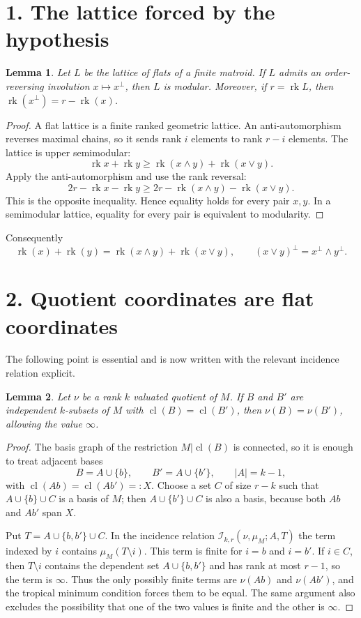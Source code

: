 \documentclass[12pt]{article}
\newcommand{\rk}{\operatorname{rk}}
\newcommand{\cl}{\operatorname{cl}}
\newtheorem{lemma}{Lemma}
\begin{document}
\section*{1. The lattice forced by the hypothesis}

\begin{lemma}
Let $L$ be the lattice of flats of a finite matroid.  If $L$ admits an
order-reversing involution $x\mapsto x^\perp$, then $L$ is modular.
Moreover, if $r=\rk L$, then $\rk(x^\perp)=r-\rk(x)$.
\end{lemma}

\begin{proof}
A flat lattice is a finite ranked geometric lattice.  An
anti-automorphism reverses maximal chains, so it sends rank $i$
elements to rank $r-i$ elements.  The lattice is upper semimodular:
\[
   \rk x+\rk y\ge \rk(x\wedge y)+\rk(x\vee y).
\]
Apply the anti-automorphism and use the rank reversal:
\[
   2r-\rk x-\rk y
   \ge
   2r-\rk(x\wedge y)-\rk(x\vee y).
\]
This is the opposite inequality.  Hence equality holds for every pair
$x,y$.  In a semimodular lattice, equality for every pair is
equivalent to modularity.
\end{proof}

Consequently
\[
  \rk(x)+\rk(y)=\rk(x\wedge y)+\rk(x\vee y),\qquad
  (x\vee y)^\perp=x^\perp\wedge y^\perp .
\]

\section*{2. Quotient coordinates are flat coordinates}

The following point is essential and is now written with the relevant
incidence relation explicit.

\begin{lemma}
Let $\nu$ be a rank $k$ valuated quotient of $M$.  If $B$ and $B'$ are
independent $k$-subsets of $M$ with $\cl(B)=\cl(B')$, then
$\nu(B)=\nu(B')$, allowing the value $\infty$.
\end{lemma}

\begin{proof}
The basis graph of the restriction $M|\cl(B)$ is connected, so it is
enough to treat adjacent bases
\[
       B=A\cup\{b\},\qquad B'=A\cup\{b'\},
       \qquad |A|=k-1,
\]
with $\cl(A b)=\cl(A b')=:X$.  Choose a set $C$ of size $r-k$ such
that $A\cup\{b\}\cup C$ is a basis of $M$; then
$A\cup\{b'\}\cup C$ is also a basis, because both $A b$ and $A b'$
span $X$.

Put $T=A\cup\{b,b'\}\cup C$.  In the incidence relation
$\mathcal I_{k,r}(\nu,\mu_M;A,T)$ the term indexed by $i$ contains
$\mu_M(T\setminus i)$.  This term is finite for $i=b$ and $i=b'$.
If $i\in C$, then $T\setminus i$ contains the dependent set
$A\cup\{b,b'\}$ and has rank at most $r-1$, so the term is $\infty$.
Thus the only possibly finite terms are
$\nu(A b)$ and $\nu(A b')$, and the tropical minimum condition forces
them to be equal.  The same argument also excludes the possibility
that one of the two values is finite and the other is $\infty$.
\end{proof}
\end{document}
